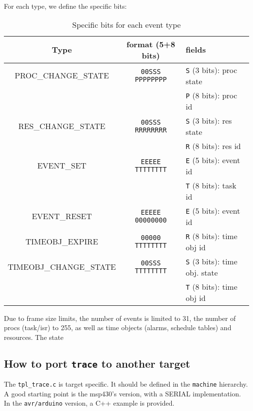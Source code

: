 For each type, we define the specific bits:

\begin{table}[htbp]
	\begin{longtable}[c]{c|c|l}
		\bf Type & \bf format (5+8 bits) & \bf fields \\ \hline
		PROC\_CHANGE\_STATE    & \texttt{00SSS PPPPPPPP}& \texttt{S} (3 bits): proc state \\
		                       &                        & \texttt{P} (8 bits): proc id    \\ \hline
		RES\_CHANGE\_STATE     & \texttt{00SSS RRRRRRRR}& \texttt{S} (3 bits): res state  \\
		                       &                        & \texttt{R} (8 bits): res id     \\ \hline
		EVENT\_SET             & \texttt{EEEEE TTTTTTTT}& \texttt{E} (5 bits): event id   \\
		                       &                        & \texttt{T} (8 bits): task id     \\ \hline
		EVENT\_RESET           & \texttt{EEEEE 00000000}& \texttt{E} (5 bits): event id   \\ \hline
		TIMEOBJ\_EXPIRE        & \texttt{00000 TTTTTTTT}& \texttt{R} (8 bits): time obj id    \\ \hline
		TIMEOBJ\_CHANGE\_STATE & \texttt{00SSS TTTTTTTT}& \texttt{S} (3 bits): time obj. state \\
		                       &                        & \texttt{T} (8 bits): time obj id    \\ \hline
	\end{longtable}
	\caption{Specific bits for each event type}
	\label{tab:traceBin}
\end{table}

Due to frame size limits, the number of events is limited to 31, the number of procs (task/isr) to 255, as well as time objects (alarms, schedule tables) and resources.
The state 

\subsection{How to port \texttt{trace} to another target}

The \texttt{tpl\_trace.c} is target specific. It should be defined in the \lstinline{machine} hierarchy. A good starting point is the msp430's version, with a SERIAL implementation. In the \texttt{avr/arduino} version, a C++ example is provided.

